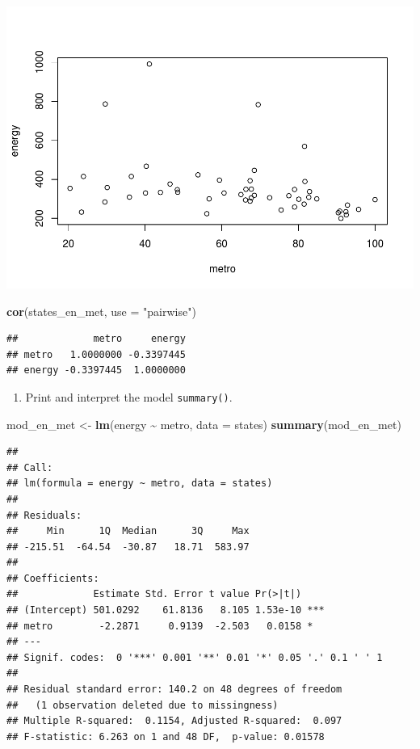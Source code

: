 \documentclass[
]{book}
\newenvironment{Shaded}{\begin{snugshade}}{\end{snugshade}}
\newcommand{\DataTypeTok}[1]{\textcolor[rgb]{0.13,0.29,0.53}{#1}}
\newcommand{\KeywordTok}[1]{\textcolor[rgb]{0.13,0.29,0.53}{\textbf{#1}}}
\newcommand{\NormalTok}[1]{#1}
\newcommand{\OperatorTok}[1]{\textcolor[rgb]{0.81,0.36,0.00}{\textbf{#1}}}
\newcommand{\StringTok}[1]{\textcolor[rgb]{0.31,0.60,0.02}{#1}}
\providecommand{\tightlist}{%
  \setlength{\itemsep}{0pt}\setlength{\parskip}{0pt}}
\begin{document}
\begin{alert}
\includegraphics{R/Rmodels/figures/unnamed-chunk-100-1.pdf}

\begin{Shaded}
\begin{Highlighting}[]
  \KeywordTok{cor}\NormalTok{(states\_en\_met, }\DataTypeTok{use =} \StringTok{"pairwise"}\NormalTok{)}
\end{Highlighting}
\end{Shaded}

\begin{verbatim}
##             metro     energy
## metro   1.0000000 -0.3397445
## energy -0.3397445  1.0000000
\end{verbatim}

\begin{enumerate}
\def\labelenumi{\arabic{enumi}.}
\setcounter{enumi}{1}
\tightlist
\item
  Print and interpret the model \texttt{summary()}.
\end{enumerate}

\begin{Shaded}
\begin{Highlighting}[]
\NormalTok{  mod\_en\_met \textless{}{-}}\StringTok{ }\KeywordTok{lm}\NormalTok{(energy }\OperatorTok{\textasciitilde{}}\StringTok{ }\NormalTok{metro, }\DataTypeTok{data =}\NormalTok{ states)}
  \KeywordTok{summary}\NormalTok{(mod\_en\_met)}
\end{Highlighting}
\end{Shaded}

\begin{verbatim}
## 
## Call:
## lm(formula = energy ~ metro, data = states)
## 
## Residuals:
##     Min      1Q  Median      3Q     Max 
## -215.51  -64.54  -30.87   18.71  583.97 
## 
## Coefficients:
##             Estimate Std. Error t value Pr(>|t|)    
## (Intercept) 501.0292    61.8136   8.105 1.53e-10 ***
## metro        -2.2871     0.9139  -2.503   0.0158 *  
## ---
## Signif. codes:  0 '***' 0.001 '**' 0.01 '*' 0.05 '.' 0.1 ' ' 1
## 
## Residual standard error: 140.2 on 48 degrees of freedom
##   (1 observation deleted due to missingness)
## Multiple R-squared:  0.1154, Adjusted R-squared:  0.097 
## F-statistic: 6.263 on 1 and 48 DF,  p-value: 0.01578
\end{verbatim}


\end{alert}
\end{document}
